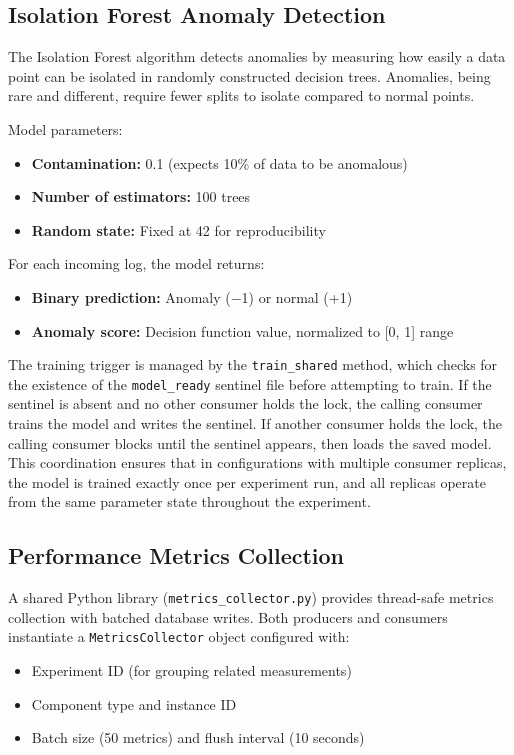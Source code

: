 \documentclass[12pt,a4paper]{report}
\begin{document}
\subsection{Isolation Forest Anomaly Detection}

The Isolation Forest algorithm \cite{IDForest2022} detects anomalies by measuring how easily a data point can be isolated in randomly constructed decision trees. Anomalies, being rare and different, require fewer splits to isolate compared to normal points.

Model parameters:
\begin{itemize}
    \item \textbf{Contamination:} 0.1 (expects 10\% of data to be anomalous)
    \item \textbf{Number of estimators:} 100 trees
    \item \textbf{Random state:} Fixed at 42 for reproducibility
\end{itemize}

For each incoming log, the model returns:
\begin{itemize}
    \item \textbf{Binary prediction:} Anomaly ($-$1) or normal (+1)
    \item \textbf{Anomaly score:} Decision function value, normalized to [0, 1] range
\end{itemize}
The training trigger is managed by the \texttt{train\_shared} method, which checks for
the existence of the \texttt{model\_ready} sentinel file before attempting to train.
If the sentinel is absent and no other consumer holds the lock, the calling consumer
trains the model and writes the sentinel. If another consumer holds the lock, the
calling consumer blocks until the sentinel appears, then loads the saved model. This
coordination ensures that in configurations with multiple consumer replicas, the model
is trained exactly once per experiment run, and all replicas operate from the same
parameter state throughout the experiment.
\subsection{Performance Metrics Collection}

A shared Python library (\texttt{metrics\_collector.py}) provides thread-safe metrics collection with batched database writes. Both producers and consumers instantiate a \texttt{MetricsCollector} object configured with:
\begin{itemize}
    \item Experiment ID (for grouping related measurements)
    \item Component type and instance ID
    \item Batch size (50 metrics) and flush interval (10 seconds)
\end{itemize}
\end{document}
